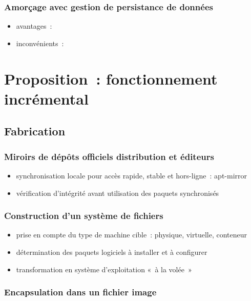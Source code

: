 \documentclass[12pt]{article}
\newenvironment{itmz}{\begin{itemize}
\setlength{\itemsep}{0em}
}{\end{itemize}}
\begin{document}
\subsubsection{Amorçage avec gestion de persistance de données}

\begin{itmz}
\item{avantages :}
\item{inconvénients :}
\end{itmz}

\section{Proposition : fonctionnement incrémental}

\subsection{Fabrication}

\subsubsection{Miroirs de dépôts officiels distribution et éditeurs}

\begin{itmz}
\item{synchronisation locale pour accès rapide, stable et hors-ligne : apt-mirror}
\item{vérification d’intégrité avant utilisation des paquets synchronisés}
\end{itmz}

\subsubsection{Construction d’un système de fichiers}

\begin{itmz}
\item{prise en compte du type de machine cible : physique, virtuelle, conteneur}
\item{détermination des paquets logiciels à installer et à configurer}
\item{transformation en système d’exploitation « à la volée »}
\end{itmz}

\subsubsection{Encapsulation dans un fichier image}
\end{document}
